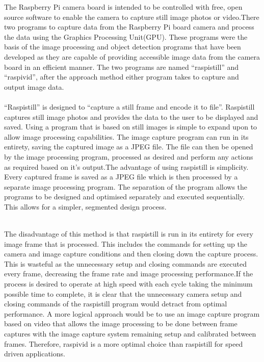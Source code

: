 \documentclass[12pt,a4paper]{report}
\begin{document}
\hspace*{1cm} The Raspberry Pi camera board is intended to be controlled with free, open source software to
enable the camera to capture still image photos or video.There two programs to capture data from the
Raspberry Pi board camera and process the data using the Graphics Processing Unit(GPU). These programs were the basis
of the image processing and object detection programs that have been developed as they are
capable of providing accessible image data from the camera board in an efficient manner. The two
programs are named “raspistill” and “raspivid”, after the approach method either program takes to
capture and output image data.\\\\
\hspace*{1cm} “Raspistill” is designed to “capture a still frame and encode it to file”. Raspistill captures still
image photos and provides the data to the user to be displayed and saved. Using a program that is
based on still images is simple to expand upon to allow image processing capabilities. The image
capture program can run in its entirety, saving the captured image as a JPEG file. The file can then be
opened by the image processing program, processed as desired and perform any actions as required based on it's output.The advantage of using raspistill is simplicity. Every captured frame is saved as a JPEG file which is
then processed by a separate image processing program. The separation of the program allows the
programs to be designed and optimised separately and executed sequentially. This allows for a
simpler, segmented design process.\\\

\hspace*{1cm} The disadvantage of this method is that raspistill is run in its entirety for every image frame that is
processed. This includes the commands for setting up the camera and image capture conditions and
then closing down the capture process. This is wasteful as the unnecessary setup and closing
commands are executed every frame, decreasing the frame rate and image processing performance.If the process is desired to operate at high speed with each cycle taking the minimum possible time
to complete, it is clear that the unnecessary camera setup and closing commands of the raspistill
program would detract from optimal performance. A more logical approach would be to use an image capture program based on video that allows the image processing to be done between frame
captures with the image capture system remaining setup and calibrated between frames. Therefore,
raspivid is a more optimal choice than raspistill for speed driven applications.\\\
\end{document}
